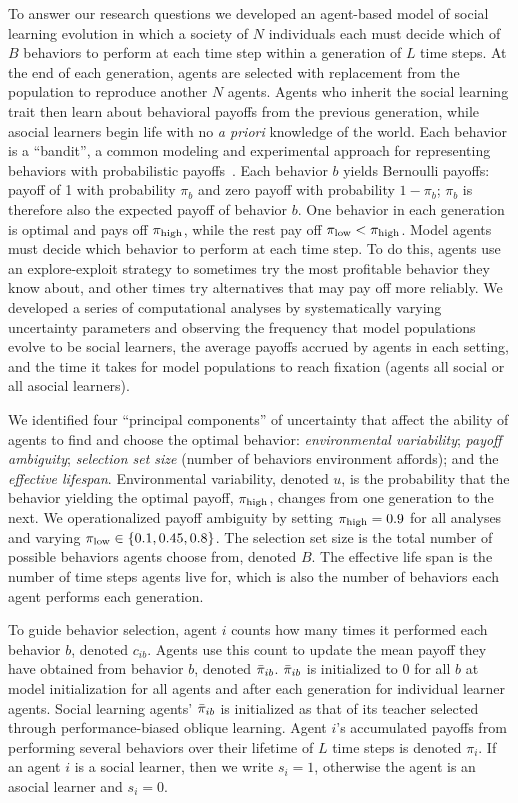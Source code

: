 \documentclass[letterpaper,11.5pt]{scrartcl}
\begin{document}
To answer our research questions
we developed an agent-based model of social learning evolution in which a society of
$N$ individuals each must decide which of $B$ behaviors to perform at each time step
within a generation of $L$ time steps. At the end of each generation, agents are selected
with replacement from the population to reproduce another $N$ agents. Agents who
inherit the social learning trait then learn about behavioral payoffs from the
previous generation, while asocial learners begin life with no \emph{a priori}
knowledge of the world.  Each behavior is a ``bandit'', a common modeling and
experimental approach for representing behaviors with probabilistic
payoffs~\cite{SuttonBartoBook,McElreath2005,Rendell2010,Schulz2019}.  Each behavior
$b$ yields Bernoulli payoffs: payoff of 1 with probability $\pi_b$ and zero payoff
with probability $1 - \pi_b$; $\pi_b$ is therefore also the expected payoff of
behavior $b$. One behavior in each generation is optimal and pays off $\pi_{\mathrm{high}}$,
while the rest pay off $\pi_{\mathrm{low}} < \pi_{\mathrm{high}}$.  Model agents must decide which behavior to
perform at each time step.  To do this, agents use an explore-exploit strategy to
sometimes try the most profitable behavior they know about, and other times try
alternatives that may pay off more reliably.  We developed a series of computational
analyses by systematically varying uncertainty parameters and observing the
frequency that model populations evolve to be social learners, the average payoffs
accrued by agents in each setting, and the time it takes for model populations to
reach fixation (agents all social or all asocial learners).

We identified four ``principal components'' of uncertainty that affect the
ability of agents to find and choose the optimal behavior: 
\emph{environmental variability}; \emph{payoff ambiguity}; \emph{selection set size}
(number of behaviors environment affords); and the \emph{effective lifespan}.
Environmental variability, denoted $u$, is the probability that the behavior
yielding the optimal payoff, $\pi_{\mathrm{high}}$, changes from one generation to the next.
We operationalized payoff ambiguity by setting $\pi_{\mathrm{high}} = 0.9$ for all analyses
and varying $\pi_{\mathrm{low}} \in \{0.1, 0.45, 0.8\}$. The selection set size is the
total number of possible behaviors agents choose from, denoted $B$. The 
effective life span is the number of time steps agents live for, which is
also the number of behaviors each agent performs each generation.

To guide behavior selection, agent $i$ counts how many times it
performed each behavior $b$, denoted $c_{ib}$. Agents use this count to 
update the mean payoff they have obtained from behavior $b$, denoted $\bar\pi_{ib}$.
$\bar\pi_{ib}$ is initialized to 0 for all $b$ at model initialization for
all agents and after each generation for individual learner agents. Social
learning agents' $\bar\pi_{ib}$ is initialized as that of its teacher selected
through performance-biased oblique learning. Agent $i$'s accumulated payoffs
from performing several behaviors over their lifetime of $L$ time steps is
denoted $\pi_{i}$. If an agent $i$ is a social learner, then we write $s_i = 1$,
otherwise the agent is an asocial learner and $s_i = 0$.
\end{document}

